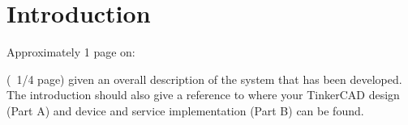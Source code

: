 \section{Introduction}
\label{sec:introduction}

Approximately 1 page on:

(~1/4 page) given an overall description of the system that has been developed. The introduction should also give a reference to where your TinkerCAD design (Part A) and device and service implementation (Part B) can be found.
